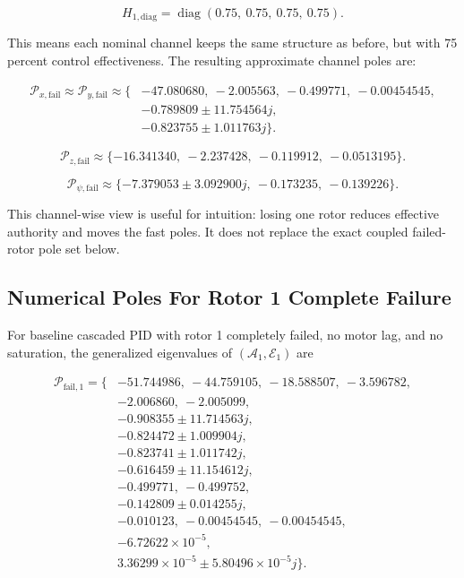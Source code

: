 \documentclass[11pt]{article}
\begin{document}
\[
H_{1,\mathrm{diag}}
=
\operatorname{diag}(0.75,\ 0.75,\ 0.75,\ 0.75).
\]

This means each nominal channel keeps the same structure as before, but with
75 percent control effectiveness. The resulting approximate channel poles are:

\[
\boxed{
\begin{aligned}
\mathcal{P}_{x,\mathrm{fail}} \approx
\mathcal{P}_{y,\mathrm{fail}} \approx \{&
-47.080680,\ -2.005563,\ -0.499771,\ -0.00454545,\\
&-0.789809\pm11.754564j,\\
&-0.823755\pm1.011763j\}.
\end{aligned}
}
\]

\[
\boxed{
\mathcal{P}_{z,\mathrm{fail}} \approx
\{-16.341340,\ -2.237428,\ -0.119912,\ -0.0513195\}.
}
\]

\[
\boxed{
\mathcal{P}_{\psi,\mathrm{fail}} \approx
\{-7.379053\pm3.092900j,\ -0.173235,\ -0.139226\}.
}
\]

This channel-wise view is useful for intuition: losing one rotor reduces
effective authority and moves the fast poles. It does not replace the exact
coupled failed-rotor pole set below.

\subsection{Numerical Poles For Rotor 1 Complete Failure}

For baseline cascaded PID with rotor 1 completely failed, no motor lag, and no
saturation, the generalized eigenvalues of
\((\mathcal{A}_1,\mathcal{E}_1)\) are

\[
\boxed{
\begin{aligned}
\mathcal{P}_{\mathrm{fail},1}=\{&
-51.744986,\ -44.759105,\ -18.588507,\ -3.596782,\\
&-2.006860,\ -2.005099,\\
&-0.908355\pm 11.714563j,\\
&-0.824472\pm 1.009904j,\\
&-0.823741\pm 1.011742j,\\
&-0.616459\pm 11.154612j,\\
&-0.499771,\ -0.499752,\\
&-0.142809\pm0.014255j,\\
&-0.010123,\ -0.00454545,\ -0.00454545,\\
&-6.72622\times10^{-5},\\
&3.36299\times10^{-5}\pm5.80496\times10^{-5}j
\}.
\end{aligned}
}
\]
\end{document}
